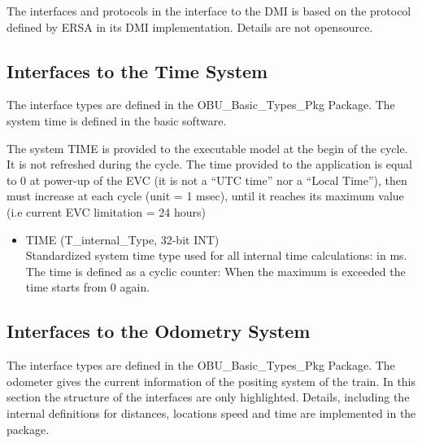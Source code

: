 \documentclass{template/openetcs_report}
\begin{document}
The interfaces and protocols in the interface to the DMI is based on the protocol defined by ERSA in its DMI implementation. Details are not opensource.

\subsection{Interfaces to the Time System}
The interface types are defined in the OBU\_Basic\_Types\_Pkg Package. The system time is defined in the basic software.

The system TIME is provided to the executable model at the begin of the cycle. It is not refreshed during the cycle. The time provided to the application is equal to 0 at power-up of the EVC (it is not a “UTC time” nor a “Local
Time”), then must increase at each cycle (unit = 1 msec), until it reaches its maximum value (i.e current EVC
limitation = 24 hours)

\begin{itemize}
\item TIME (T\_internal\_Type, 32-bit INT)\\
Standardized system time type used for all internal time calculations: in ms. The time is defined as a cyclic counter: When the maximum is exceeded the time starts from 0 again. 
\end{itemize}

\subsection{Interfaces to the Odometry System}
The interface types are defined in the OBU\_Basic\_Types\_Pkg Package. 
The odometer gives the current information of the positing system of the train. In this section the structure of the interfaces are only highlighted. Details, including the internal definitions for distances, locations speed and time are implemented in the package. 
\end{document}
